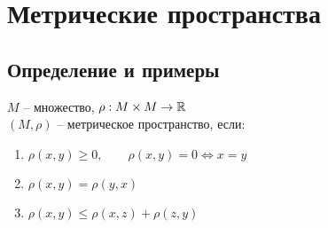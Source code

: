 \chapter{Метрические пространства}

\section{Определение и примеры}

\begin{definition}
	$M$ -- множество, $\rho : M \times M \to \mathbb{R}$ \\
	$(M, \rho)$ -- метрическое пространство, если:
	\begin{enumerate}
		\item $\rho(x, y) \ge 0, \qquad \rho(x, y) = 0 \iff x = y $
		\item $\rho(x, y) = \rho(y, x)$
		\item $\rho(x, y) \le \rho(x, z) + \rho(z, y) $
	\end{enumerate}
\end{definition}

